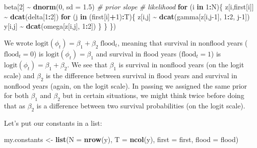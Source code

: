 \documentclass[
  12pt,
]{krantz}
\newenvironment{Shaded}{\begin{snugshade}}{\end{snugshade}}
\newcommand{\AttributeTok}[1]{\textcolor[rgb]{0.13,0.29,0.53}{#1}}
\newcommand{\CommentTok}[1]{\textcolor[rgb]{0.56,0.35,0.01}{\textit{#1}}}
\newcommand{\ControlFlowTok}[1]{\textcolor[rgb]{0.13,0.29,0.53}{\textbf{#1}}}
\newcommand{\DecValTok}[1]{\textcolor[rgb]{0.00,0.00,0.81}{#1}}
\newcommand{\FloatTok}[1]{\textcolor[rgb]{0.00,0.00,0.81}{#1}}
\newcommand{\FunctionTok}[1]{\textcolor[rgb]{0.13,0.29,0.53}{\textbf{#1}}}
\newcommand{\NormalTok}[1]{#1}
\newcommand{\OtherTok}[1]{\textcolor[rgb]{0.56,0.35,0.01}{#1}}
\newcommand{\SpecialCharTok}[1]{\textcolor[rgb]{0.81,0.36,0.00}{\textbf{#1}}}
\begin{document}
\begin{Shaded}
\begin{Highlighting}[]
\NormalTok{  beta[}\DecValTok{2}\NormalTok{] }\SpecialCharTok{\textasciitilde{}} \FunctionTok{dnorm}\NormalTok{(}\DecValTok{0}\NormalTok{, }\AttributeTok{sd =} \FloatTok{1.5}\NormalTok{) }\CommentTok{\# prior slope}
  \CommentTok{\# likelihood}
  \ControlFlowTok{for}\NormalTok{ (i }\ControlFlowTok{in} \DecValTok{1}\SpecialCharTok{:}\NormalTok{N)\{}
\NormalTok{    z[i,first[i]] }\SpecialCharTok{\textasciitilde{}} \FunctionTok{dcat}\NormalTok{(delta[}\DecValTok{1}\SpecialCharTok{:}\DecValTok{2}\NormalTok{])}
    \ControlFlowTok{for}\NormalTok{ (j }\ControlFlowTok{in}\NormalTok{ (first[i]}\SpecialCharTok{+}\DecValTok{1}\NormalTok{)}\SpecialCharTok{:}\NormalTok{T)\{}
\NormalTok{      z[i,j] }\SpecialCharTok{\textasciitilde{}} \FunctionTok{dcat}\NormalTok{(gamma[z[i,j}\DecValTok{{-}1}\NormalTok{], }\DecValTok{1}\SpecialCharTok{:}\DecValTok{2}\NormalTok{, j}\DecValTok{{-}1}\NormalTok{])}
\NormalTok{      y[i,j] }\SpecialCharTok{\textasciitilde{}} \FunctionTok{dcat}\NormalTok{(omega[z[i,j], }\DecValTok{1}\SpecialCharTok{:}\DecValTok{2}\NormalTok{])}
\NormalTok{    \}}
\NormalTok{  \}}
\NormalTok{\})}
\end{Highlighting}
\end{Shaded}

We wrote \(\text{logit}(\phi_t) = \beta_1 + \beta_2 \; \text{flood}_t\), meaning that survival in nonflood years (\(\text{flood}_t = 0\)) is \(\text{logit}(\phi_t) = \beta_1\) and survival in flood years (\(\text{flood}_t = 1\)) is \(\text{logit}(\phi_t) = \beta_1 + \beta_2\). We see that \(\beta_1\) is survival in nonflood years (on the logit scale) and \(\beta_2\) is the difference between survival in flood years and survival in nonflood years (again, on the logit scale). In passing we assigned the same prior for both \(\beta_1\) and \(\beta_2\) but in certain situations, we might think twice before doing that as \(\beta_2\) is a difference between two survival probabilities (on the logit scale).

Let's put our constants in a list:

\begin{Shaded}
\begin{Highlighting}[]
\NormalTok{my.constants }\OtherTok{\textless{}{-}} \FunctionTok{list}\NormalTok{(}\AttributeTok{N =} \FunctionTok{nrow}\NormalTok{(y),}
                     \AttributeTok{T =} \FunctionTok{ncol}\NormalTok{(y),}
                     \AttributeTok{first =}\NormalTok{ first,}
                     \AttributeTok{flood =}\NormalTok{ flood)}
\end{Highlighting}
\end{Shaded}
\end{document}

